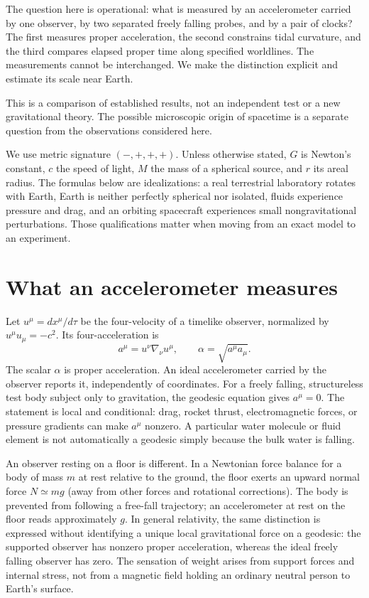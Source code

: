 \documentclass[11pt,letterpaper]{article}
\begin{document}
The question here is operational: what is measured by an accelerometer carried by one observer, by two separated freely falling probes, and by a pair of clocks? The first measures proper acceleration, the second constrains tidal curvature, and the third compares elapsed proper time along specified worldlines. The measurements cannot be interchanged. We make the distinction explicit and estimate its scale near Earth.

This is a comparison of established results, not an independent test or a new gravitational theory. The possible microscopic origin of spacetime is a separate question from the observations considered here.

We use metric signature $(-,+,+,+)$. Unless otherwise stated, $G$ is Newton's constant, $c$ the speed of light, $M$ the mass of a spherical source, and $r$ its areal radius. The formulas below are idealizations: a real terrestrial laboratory rotates with Earth, Earth is neither perfectly spherical nor isolated, fluids experience pressure and drag, and an orbiting spacecraft experiences small nongravitational perturbations. Those qualifications matter when moving from an exact model to an experiment.

\section{What an accelerometer measures}

Let $u^\mu=dx^\mu/d\tau$ be the four-velocity of a timelike observer, normalized by $u^\mu u_\mu=-c^2$. Its four-acceleration is
\begin{equation}
 a^\mu=u^\nu\nabla_\nu u^\mu,\qquad
 \alpha=\sqrt{a^\mu a_\mu}.
 \label{eq:proper}
\end{equation}
The scalar $\alpha$ is proper acceleration. An ideal accelerometer carried by the observer reports it, independently of coordinates. For a freely falling, structureless test body subject only to gravitation, the geodesic equation gives $a^\mu=0$. The statement is local and conditional: drag, rocket thrust, electromagnetic forces, or pressure gradients can make $a^\mu$ nonzero. A particular water molecule or fluid element is not automatically a geodesic simply because the bulk water is falling.

An observer resting on a floor is different. In a Newtonian force balance for a body of mass $m$ at rest relative to the ground, the floor exerts an upward normal force $N\simeq mg$ (away from other forces and rotational corrections). The body is prevented from following a free-fall trajectory; an accelerometer at rest on the floor reads approximately $g$. In general relativity, the same distinction is expressed without identifying a unique local gravitational force on a geodesic: the supported observer has nonzero proper acceleration, whereas the ideal freely falling observer has zero. The sensation of weight arises from support forces and internal stress, not from a magnetic field holding an ordinary neutral person to Earth's surface.
\end{document}
